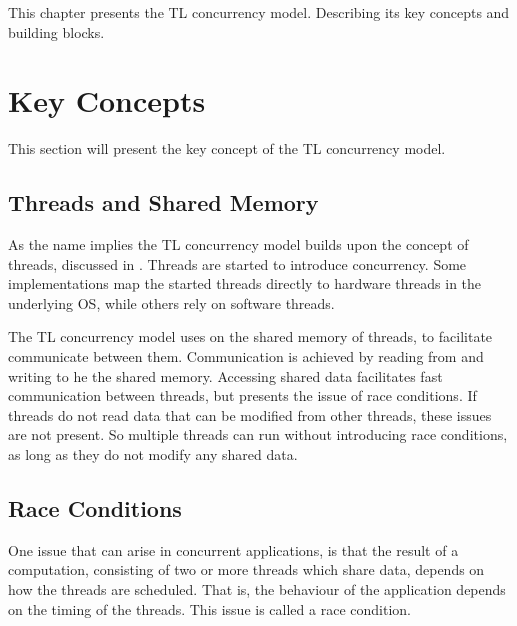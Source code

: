 \makeatletter {}\makeatother
{}
This chapter presents the \ac{TL} concurrency model. Describing its key concepts and building blocks.
\label{chap:threads_locks}
\section{Key Concepts}
This section will present the key concept of the \ac{TL} concurrency model. 
\subsection{Threads and Shared Memory}\label{subsec:threads_shared_memory}
As the name implies the \ac{TL} concurrency model builds upon the concept of threads, discussed in . Threads are started to introduce concurrency. Some implementations map the started threads directly to hardware threads in the underlying \ac{OS}, while others rely on software threads.

The \ac{TL} concurrency model uses on the shared memory of threads, to facilitate communicate between them. Communication is achieved by reading from and writing to he the shared memory\cite[p. 93]{tanenbaum2008modern}. Accessing shared data facilitates fast communication between threads, but presents the issue of race conditions. If threads do not read data that can be modified from other threads, these issues are not present. So multiple threads can run without introducing race conditions, as long as they do not modify any shared data.

\subsection{Race Conditions}\label{subsec:race_coditions}
One issue that can arise in concurrent applications, is that the result of a computation, consisting of two or more threads which share data, depends on how the threads are scheduled. That is, the behaviour of the application depends on the timing of the threads. This issue is called a race condition\cite[p. 983]{bryant2011computer}\cite[p. 115]{tanenbaum2008modern}\cite[p. 44]{sevenModels}.

